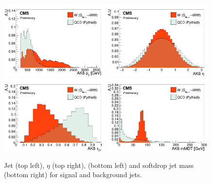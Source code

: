 \begin{figure}[h!]
\centering
\includegraphics[width=0.49\textwidth]{figures/vtagging/AN-18-099/input/inputs/sig-bkg/jpt.png}
\includegraphics[width=0.49\textwidth]{figures/vtagging/AN-18-099/input/inputs/sig-bkg/jeta.png}\\
\includegraphics[width=0.49\textwidth]{figures/vtagging/AN-18-099/input/inputs/sig-bkg/jtau21.png}
\includegraphics[width=0.49\textwidth]{figures/vtagging/AN-18-099/input/inputs/sig-bkg/msoftdrop_beta0.png}
\caption{Jet \PT (top left), $\eta$ (top right), \nsubj (bottom left) and softdrop jet mass (bottom right) for signal and background jets.}
\label{fig:lola:kinematics}
\end{figure}
